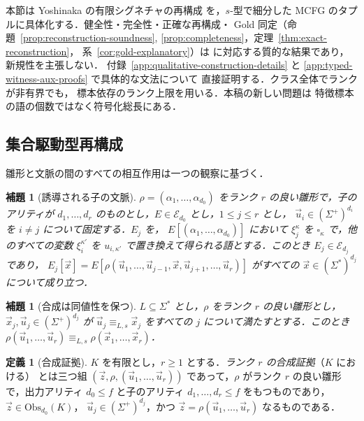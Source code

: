 \documentclass[11pt,a4paper]{ltjsarticle}
\numberwithin{equation}{section}
\theoremstyle{plain}
\newtheorem{lemma}[theorem]{補題}
\theoremstyle{definition}
\newtheorem{definition}[theorem]{定義}
\theoremstyle{remark}
\newcommand{\tuple}[1]{\vec{#1}}
\newcommand{\blank}{\square}
\theoremstyle{plain}
\begin{document}
本節は Yoshinaka の有限シグネチャの再構成
\cite{Yoshinaka2015General} を，$s$-型で細分した
MCFG のタプルに具体化する．健全性・完全性・正確な再構成・
Gold 同定（命題~\ref{prop:reconstruction-soundness},
\ref{prop:completeness}，定理~\ref{thm:exact-reconstruction}，
系~\ref{cor:gold-explanatory}）は
\cite[Lemmas~2--3 and Theorem~1]{Yoshinaka2015General}
に対応する質的な結果であり，新規性を主張しない．
付録~\ref{app:qualitative-construction-details} と
\ref{app:typed-witness-aux-proofs} で具体的な文法について
直接証明する．クラス全体でランクが非有界でも，
標本依存のランク上限を用いる．本稿の新しい問題は
特徴標本の語の個数ではなく符号化総長にある．

\subsection{集合駆動型再構成}

雛形と文脈の間のすべての相互作用は一つの観察に基づく．

\begin{lemma}[誘導される子の文脈]
\label{lem:filling-identity}
$\rho=(\alpha_1,\ldots,\alpha_{d_0})$ をランク $r$ の良い雛形で，子の
アリティが $d_1,\ldots,d_r$ のものとし，$E\in\mathcal E_{d_0}$ とし，$1\le j\le r$ とし，
$\tuple u_i\in(\Sigma^+)^{d_i}$ を $i\ne j$ について固定する．$E_j$ を，
$E[(\alpha_1,\ldots,\alpha_{d_0})]$ において $\xi_j^\kappa$ を
$\blank_\kappa$ で，他のすべての変数 $\xi_i^{\kappa'}$ を $u_{i,\kappa'}$ で置き換えて得られる語とする．このとき
$E_j\in\mathcal E_{d_j}$ であり，
$E_j[\tuple x]=E[\rho(\tuple u_1,\ldots,\tuple u_{j-1},\tuple x,
\tuple u_{j+1},\ldots,\tuple u_r)]$ がすべての
$\tuple x\in(\Sigma^*)^{d_j}$ について成り立つ．
\end{lemma}


\begin{lemma}[合成は同値性を保つ]
\label{lem:witnessed-composition}
$L\subseteq\Sigma^*$ とし，$\rho$ をランク $r$ の良い雛形とし，
$\tuple x_j,\tuple u_j\in(\Sigma^+)^{d_j}$ が
$\tuple u_j\equiv_{L,s}\tuple x_j$ をすべての $j$ について満たすとする．このとき
$\rho(\tuple u_1,\ldots,\tuple u_r)\equiv_{L,s}\rho(\tuple x_1,\ldots,\tuple x_r)$．
\end{lemma}

\begin{definition}[合成証拠]
\label{def:composition-witness}
$K$ を有限とし，$r\ge1$ とする．\emph{ランク $r$ の合成証拠}（$K$ における）
とは三つ組 $(\tuple z,\rho,(\tuple u_1,\ldots,\tuple u_r))$ であって，$\rho$
がランク $r$ の良い雛形で，出力アリティ $d_0\le f$ と子のアリティ
$d_1,\ldots,d_r\le f$ をもつものであり，$\tuple z\in\mathrm{Obs}_{d_0}(K)$，
$\tuple u_j\in(\Sigma^+)^{d_j}$，かつ
$\tuple z=\rho(\tuple u_1,\ldots,\tuple u_r)$ なるものである．
\end{definition}
\end{document}
